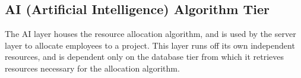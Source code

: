 \documentclass[]{article}
\begin{document}
\begin{adjustwidth}{2.5em}{0pt}
			
			\subsection*{AI (Artificial Intelligence) Algorithm Tier}
			\begin{flushleft}
			    The AI layer houses the resource allocation algorithm, and is used by the server layer to allocate employees to a project. This layer runs off its own independent resources, and is dependent only on the database tier from which it retrieves resources necessary for the allocation algorithm.
			  
			\end{flushleft}
	\end{adjustwidth}
	
	\newpage
%
%
\end{document}
